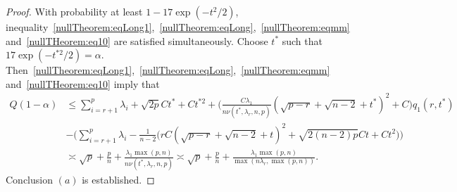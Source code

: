 \begin{proof}
    With probability at least $1-17\exp(-t^2/2)$, inequality~\eqref{nullTheorem:eqLong1},~\eqref{nullTheorem:eqLong},~\eqref{nullTheorem:eqmm} and~\eqref{nullTHeorem:eq10} are satisfied simultaneously.
    Choose $t^*$ such that $17\exp(-t^{*2}/2)=\alpha$.
    Then~\eqref{nullTheorem:eqLong1},~\eqref{nullTheorem:eqLong},~\eqref{nullTheorem:eqmm} and~\eqref{nullTHeorem:eq10} imply that
\begin{equation*}
    \begin{split}
        Q(1-\alpha)&\leq
\sum_{i=r+1}^p \lambda_i+\sqrt{2p}Ct^* +C t^{*2}
    +
\big(\frac{C\lambda_1}{n\nu(t^*,\lambda_r,n,p)}(\sqrt{p-r}+\sqrt{n-2}+t^*)^2+C\big) q_1(r,t^*)\\
        &-\Big(\sum_{i=r+1}^p \lambda_i-
        \frac{1}{n-2}
\big(
rC(\sqrt{p-r}+\sqrt{n-2}+t)^2+\sqrt{2(n-2)p}Ct+Ct^2
        \big)\Big)\\
        &\asymp
        \sqrt{p}+\frac{p}{n}+\frac{\lambda_1\max(p,n)}{n \nu(t^*,\lambda_r,n,p)}
        \asymp
        \sqrt{p}+\frac{p}{n}+\frac{\lambda_1\max(p,n)}{\max(n\lambda_r,\max(p,n))}.
    \end{split}
\end{equation*}
Conclusion $(a)$ is established.




\end{proof}


